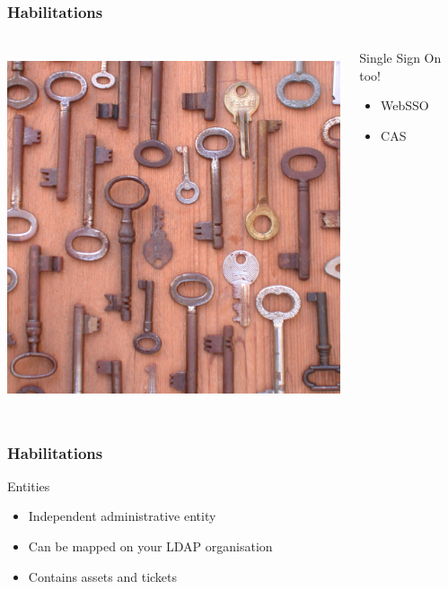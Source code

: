 \documentclass{beamer}
\begin{document}
\begin{frame}
    \frametitle{Habilitations}


 \begin{columns}
 \begin{column}{0.34\textwidth}
    \includegraphics[height=10.5cm]{pics/sso.jpg}
 \end{column}
 \begin{column}{0.90\textwidth}
    \begin{block}{Single Sign On too!}
        \begin{itemize}
            \item WebSSO
            \item CAS
        \end{itemize}
    \end{block}
 \end{column}
\end{columns}

\end{frame}


\begin{frame}
\frametitle{Habilitations}
    \begin{block}{Entities}
        \begin{itemize}
            \item Independent administrative entity
            \item Can be mapped on your LDAP organisation
            \item Contains assets and tickets
        \end{itemize}

    \end{block}
\end{frame}
\end{document}
